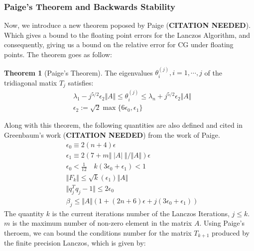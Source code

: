 \documentclass[]{article}
\theoremstyle{definition}
\newtheorem{theorem}{Theorem}            %
\begin{document}
        \subsubsection{Paige's Theorem and Backwards Stability}
            Now, we introduce a new theorem poposed by Paige (\textbf{CITATION NEEDED}). Which gives a bound to the floating point errors for the Lanczos Algorithm, and consequently, giving us a bound on the relative error for CG under floating points. The theorem goes as follow: 
            \begin{theorem}[Paige's Theorem]
                The eigenvalues $\theta_i^{(j)}, i = 1, \cdots, j$ of the tridiagonal matix $T_j$ satisfies: 
                \begin{align}
                    & 
                    \lambda_1 - j^{5/2}\epsilon_2\Vert A\Vert 
                    \le \theta_i^{(j)}
                    \le 
                    \lambda_n + j^{5/2}\epsilon_2\Vert A\Vert
                    \\
                    &
                    \epsilon_2 := \sqrt{2}\max\{6\epsilon_0, \epsilon_1\}
                \end{align}
            \end{theorem}
            Along with this theorem, the following quantities are also defined and cited in Greenbaum's work (\textbf{CITATION NEEDED}) from the work of Paige. 
            \begin{align}
                & \epsilon_0 \equiv 2(n + 4)\epsilon
                \\
                & \epsilon_1 \equiv 2(7 + m \Vert  \;|A|\;\Vert/\Vert A\Vert)\epsilon
                \\
                & \epsilon_0 < \frac{1}{12} \quad k(3\epsilon_0 + \epsilon_1) < 1
                \\
                & \Vert F_k\Vert \le \sqrt{k}(\epsilon_1) \Vert A\Vert
                \\
                & \Vert q^T_jq_j -1\Vert \le 2\epsilon_0
                \\
                & \beta_j \le \Vert A\Vert(1 + (2n + 6)\epsilon + j(3\epsilon_0 + \epsilon_1))
            \end{align}
            The quantity $k$ is the current iterations number of the Lanczos Iterations, $j\le k$. $m$ is the maximum number of non-zero element in the matrix $A$. 
            Using Paige's theroem, we can bound the conditions number for the matrix $T_{k + 1}$ produced by the finite precision Lanczos, which is given by: 
\end{document}
